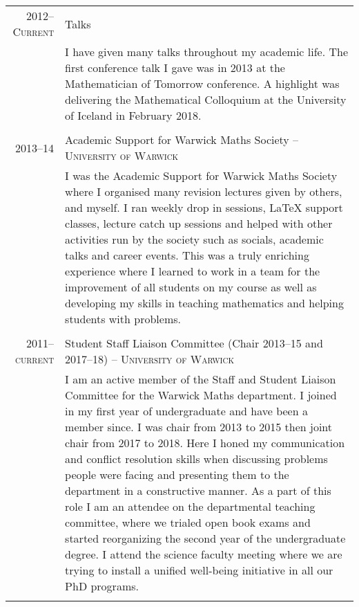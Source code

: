 \documentclass[a4paper,10pt]{article}
\begin{document}
\begin{tabular}{r|p{15cm}}
	\textsc{2012--Current} & Talks\\&\footnotesize{I have given many talks throughout my academic life. The first conference talk I gave was in 2013 at the Mathematician of Tomorrow conference. A highlight was delivering the Mathematical Colloquium at the University of Iceland in February 2018.}\\\multicolumn{2}{c}{}\\
	\textsc{2013--14}& Academic Support for Warwick Maths Society -- \textsc{University of Warwick}\\&\footnotesize{I was the Academic Support for Warwick Maths Society where I organised many revision lectures given by others, and myself. I ran weekly drop in sessions, LaTeX support classes, lecture catch up sessions and helped with other activities run by the society such as socials, academic talks and career events. This was a truly enriching experience where I learned to work in a team for the improvement of all students on my course as well as developing my skills in teaching mathematics and helping students with problems.}\\\multicolumn{2}{c}{} \\
	\textsc{2011--current}& Student Staff Liaison Committee (Chair 2013--15 and 2017--18) -- \textsc{University of Warwick}\\&\footnotesize{I am an active member of the Staff and Student Liaison Committee for the Warwick Maths department. I joined in my first year of undergraduate and have been a member since. I was chair from 2013 to 2015 then joint chair from 2017 to 2018. Here I honed my communication and conflict resolution skills when discussing problems people were facing and presenting them to the department in a constructive manner. As a part of this role I am an attendee on the departmental teaching committee, where we trialed open book exams and started reorganizing the second year of the undergraduate degree. I attend the science faculty meeting where we are trying to install a unified well-being initiative in all our PhD programs.}\\\multicolumn{2}{c}{} \\
\end{tabular}
\end{document}
